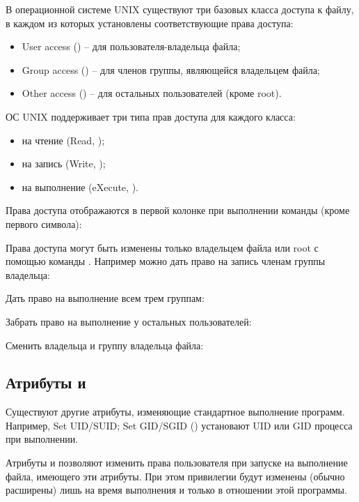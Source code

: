 В операционной системе UNIX существуют три базовых класса доступа к файлу, в каждом из которых установлены соответствующие права доступа:
\begin{itemize}
	\item User access () -- для пользователя-владельца файла;
	\item Group access () -- для членов группы, являющейся владельцем файла;
	\item Other access () -- для остальных пользователей (кроме root).
\end{itemize}

ОС UNIX поддерживает три типа прав доступа для каждого класса: 
\begin{itemize}
	\item на чтение (Read, );
	\item на запись (Write, );
	\item на выполнение (eXecute, ).
\end{itemize}

Права доступа отображаются в первой колонке при выполнении команды  (кроме первого символа):


Права доступа могут быть изменены только владельцем файла или root с помощью команды . Например можно дать право на запись членам группы владельца:


Дать право на выполнение всем трем группам:


Забрать право на выполнение у остальных пользователей:


Сменить владельца и группу владельца файла:


\subsection{Атрибуты  и }

Существуют другие атрибуты, изменяющие стандартное выполнение программ. Например, Set UID/SUID; Set GID/SGID () установают UID или GID процесса при выполнении.

Атрибуты  и  позволяют изменить права пользователя при запуске на выполнение файла, имеющего эти атрибуты. При этом привилегии будут изменены (обычно расширены) лишь на время выполнения и только в отношении этой программы.

